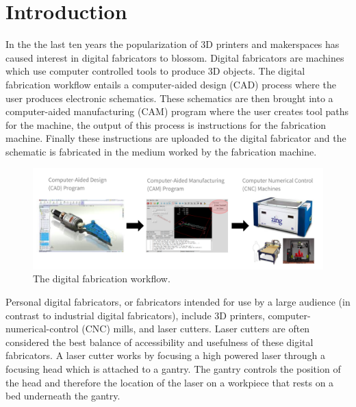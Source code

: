 

\section{Introduction}



In the the last ten years the popularization of 3D printers and makerspaces has caused interest in digital fabricators to blossom. Digital fabricators are machines which use computer controlled tools to produce 3D objects. The digital fabrication workflow entails a computer-aided design (CAD) process where the user produces electronic schematics. These schematics are then brought into a computer-aided manufacturing (CAM) program where the user creates tool paths for the machine, the output of this process is instructions for the fabrication machine. Finally these instructions are uploaded to the digital fabricator and the schematic is fabricated in the medium worked by the fabrication machine. 

\begin{figure}[H]
  \includegraphics[width=\linewidth]{digiFabWorkflow.jpg}
  \caption{The digital fabrication workflow.}
  \label{fig:digiFabWorkflow}
\end{figure}

Personal digital fabricators, or fabricators intended for use by a large audience (in contrast to industrial digital fabricators), include 3D printers, computer-numerical-control (CNC) mills, and laser cutters. Laser cutters are often considered the best balance of accessibility and usefulness of these digital fabricators. A laser cutter works by focusing a high powered laser through a focusing head which is attached to a gantry. The gantry controls the position of the head and therefore the location of the laser on a workpiece that rests on a bed underneath the gantry.

